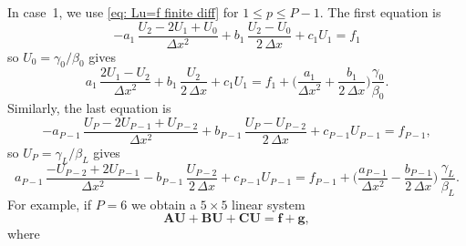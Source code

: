 In case~1, we use \eqref{eq: Lu=f finite diff} for $1\le p\le P-1$.
The first equation is
\[
-a_1\,\frac{U_2-2U_1+U_0}{\Delta x^2}+b_1\,\frac{U_2-U_0}{2\,\Delta x}
	+c_1U_1=f_1
\]
so $U_0=\gamma_0/\beta_0$ gives
\[
a_1\,\frac{2U_1-U_2}{\Delta x^2}+b_1\,\frac{U_2}{2\,\Delta x}+c_1U_1
	=f_1+\biggl(\frac{a_1}{\Delta x^2}+\frac{b_1}{2\,\Delta x}\biggr)
	\frac{\gamma_0}{\beta_0}.
\]
Similarly, the last equation is
\[
-a_{P-1}\,\frac{U_P-2U_{P-1}+U_{P-2}}{\Delta x^2}
	+b_{P-1}\,\frac{U_P-U_{P-2}}{2\,\Delta x}+c_{P-1}U_{P-1}=f_{P-1},
\]
so $U_P=\gamma_L/\beta_L$ gives
\[
a_{P-1}\,\frac{-U_{P-2}+2U_{P-1}}{\Delta x^2}
	-b_{P-1}\,\frac{U_{P-2}}{2\,\Delta x}+c_{P-1}U_{P-1}
	=f_{P-1}+\biggl(\frac{a_{P-1}}{\Delta x^2}-\frac{b_{P-1}}{2\,\Delta x}
	\biggr)\,\frac{\gamma_L}{\beta_L}.
\]
For example, if $P=6$ we obtain a $5\times5$ linear system
\begin{equation}\label{eq: finite diff matrix 1d}
\boldsymbol{A}\boldsymbol{U}+\boldsymbol{B}\boldsymbol{U}
	+\boldsymbol{C}\boldsymbol{U}=\boldsymbol{f}+\boldsymbol{g},
\end{equation}
where
